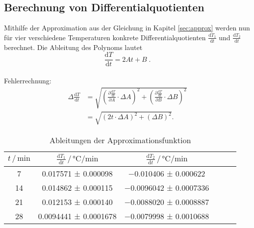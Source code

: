 \subsection{Berechnung von Differentialquotienten} %
Mithilfe der Approximation aus der Gleichung in Kapitel \ref{sec:approx} werden nun für vier verschiedene Temperaturen konkrete  Differentialquotienten $\frac{\mathrm{d}T_1}{\mathrm{d}t}$ und $\frac{\mathrm{d}T_2}{\mathrm{d}t}$ berechnet.
Die Ableitung des Polynoms lautet
\[
\frac{\mathrm{d}T}{\mathrm{d}t} = 2At + B \; .
\]
\\
Fehlerrechnung:
\begin{align*}
  \Delta \frac{\mathrm{d}T}{\mathrm{d}t}
  &= \sqrt{\left(\frac{\partial \frac{\mathrm{d}T}{\mathrm{d}t}}{\partial A} \cdot \Delta A\right)^2 + \left(\frac{\partial \frac{\mathrm{d}T}{\mathrm{d}t}}{\partial B} \cdot \Delta B\right)^2} \\
  &= \sqrt{(2t \cdot \Delta A)^2 + (\Delta B)^2} .
\end{align*}

\begin{table}
\centering
\caption{Ableitungen der Approximationsfunktion}
\label{tab:derivatives}
\begin{tabular}{c c c c c c}
\toprule
$t \,/\, \si{\minute}$ &
$\frac{\mathrm{d}T_1}{\mathrm{d}t} \,/\, \si{\celsius\per\minute}$ &
$\frac{\mathrm{d}T_2}{\mathrm{d}t} \,/\, \si{\celsius\per\minute}$ \\
\midrule
7  & \num{0.017571}  ± \num{0.000098}  & \num{-0.010406}  ± \num{0.000622} \\
14 & \num{0.014862}  ± \num{0.000115}  & \num{-0.0096042} ± \num{0.0007336} \\
21 & \num{0.012153}  ± \num{0.000140}  & \num{-0.0088020} ± \num{0.0008887} \\
28 & \num{0.0094441} ± \num{0.0001678} & \num{-0.0079998} ± \num{0.0010688} \\



\bottomrule
\end{tabular}
\end{table}


